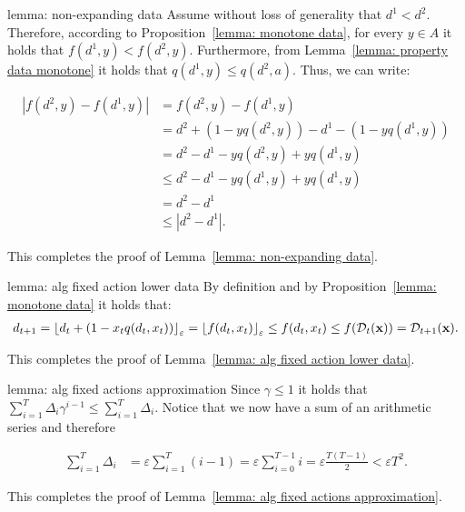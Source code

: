 \begin{proofof}{lemma: non-expanding data}
Assume without loss of generality that $d^1 < d^2$. Therefore, according to Proposition~\ref{lemma: monotone data}, for every $y \in A$ it holds that $f(d^1, y) < f(d^2, y)$. Furthermore, from Lemma~\ref{lemma: property data monotone} it holds that $q(d^1, y) \leq q(d^2, a)$. Thus, we can write:

\begin{align*}
\left| f(d^2, y) - f(d^1, y) \right| &= f(d^2, y) - f(d^1, y) \\
&= d^2 + (1-yq(d^2, y)) - d^1 - (1-yq(d^1, y)) \\
&= d^2 - d^1 - yq(d^2, y) + yq(d^1, y) \\
&\leq d^2 - d^1 - yq(d^1, y) + yq(d^1, y) \\
&= d^2 - d^1 \\
&\leq \left| d^2 - d^1 \right|.
\end{align*}

This completes the proof of Lemma~\ref{lemma: non-expanding data}.
\end{proofof}


\begin{proofof}{lemma: alg fixed action lower data}
By definition and by Proposition~\ref{lemma: monotone data} it holds that:
\begin{align*}
d_{t+1} = {\left\lfloor d_t + (1-x_t q(d_t, x_t))\right\rfloor_{\varepsilon}} = {\left\lfloor f(d_t, x_t)\right\rfloor_{\varepsilon}} \leq f(d_t, x_t) \leq f(\mathcal{D}_t({\bf{x}})) = \mathcal{D}_{t+1}({\bf{x}}).
\end{align*}   

This completes the proof of Lemma~\ref{lemma: alg fixed action lower data}.
\end{proofof}


\begin{proofof}{lemma: alg fixed actions approximation}
Since $\gamma \leq 1$ it holds that $\sum_{i = 1}^T \Delta_i \gamma^{i-1} \leq \sum_{i = 1}^T \Delta_i$. Notice that we now have a sum of an arithmetic series and therefore

\begin{align*}
\sum_{i = 1}^T \Delta_i &= \varepsilon\sum_{i = 1}^T (i-1) = \varepsilon \sum_{i = 0}^{T-1} i = \varepsilon \frac{T(T-1)}{2} < \varepsilon T^2.
\end{align*}

This completes the proof of Lemma~\ref{lemma: alg fixed actions approximation}.
\end{proofof}




